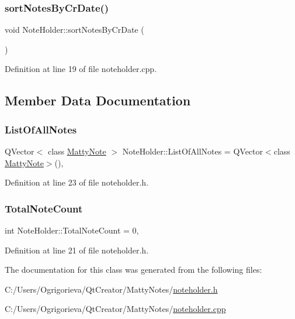 \subsubsection{\texorpdfstring{sort\+Notes\+By\+Cr\+Date()}{sortNotesByCrDate()}}
{\footnotesize\ttfamily void Note\+Holder\+::sort\+Notes\+By\+Cr\+Date (\begin{DoxyParamCaption}{ }\end{DoxyParamCaption})}



Definition at line 19 of file noteholder.\+cpp.



\subsection{Member Data Documentation}
\hypertarget{classNoteHolder_aba93502b4bdb3358063a0433fe4def4f}{}\label{classNoteHolder_aba93502b4bdb3358063a0433fe4def4f} 
\subsubsection{\texorpdfstring{List\+Of\+All\+Notes}{ListOfAllNotes}}
{\footnotesize\ttfamily Q\+Vector$<$ class \hyperlink{classMattyNote}{Matty\+Note} $>$ Note\+Holder\+::\+List\+Of\+All\+Notes = Q\+Vector$<$class \hyperlink{classMattyNote}{Matty\+Note}$>$()\hspace{0.3cm}{\ttfamily [static]}, {\ttfamily [private]}}



Definition at line 23 of file noteholder.\+h.

\hypertarget{classNoteHolder_aeb685924427caabb7087ef7cf743c913}{}\label{classNoteHolder_aeb685924427caabb7087ef7cf743c913} 
\subsubsection{\texorpdfstring{Total\+Note\+Count}{TotalNoteCount}}
{\footnotesize\ttfamily int Note\+Holder\+::\+Total\+Note\+Count = 0\hspace{0.3cm}{\ttfamily [static]}, {\ttfamily [private]}}



Definition at line 21 of file noteholder.\+h.



The documentation for this class was generated from the following files\+:\begin{DoxyCompactItemize}
\item 
C\+:/\+Users/\+Ogrigorieva/\+Qt\+Creator/\+Matty\+Notes/\hyperlink{noteholder_8h}{noteholder.\+h}\item 
C\+:/\+Users/\+Ogrigorieva/\+Qt\+Creator/\+Matty\+Notes/\hyperlink{noteholder_8cpp}{noteholder.\+cpp}\end{DoxyCompactItemize}
